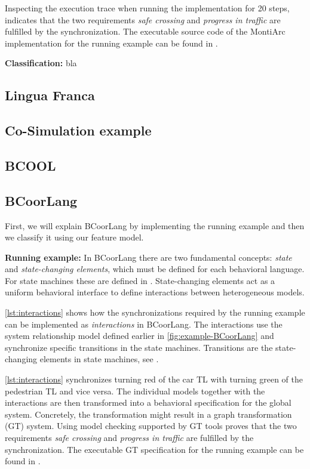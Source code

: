 \documentclass[runningheads]{llncs}
\begin{document}
Inspecting the execution trace when running the implementation for 20 steps, indicates that the two requirements \textit{safe crossing} and \textit{progress in traffic} are fulfilled by the synchronization.
The executable source code of the MontiArc implementation for the running example can be found in \cite{krauterCoordination2024Artifacts2024}.

\textbf{Classification:} bla
\subsection{Lingua Franca} %
\subsection{Co-Simulation example} %
\subsection{BCOOL} %
\subsection{BCoorLang}
First, we will explain BCoorLang by implementing the running example and then we classify it using our feature model.

\textbf{Running example:} In BCoorLang there are two fundamental concepts: \textit{state} and \textit{state-changing elements}, which must be defined for each behavioral language.
For state machines these are defined in \cite{krauterBehavioralConsistencyMultimodeling2023}.
State-changing elements act as a uniform behavioral interface to define interactions between heterogeneous models.

\autoref{lst:interactions} shows how the synchronizations required by the running example can be implemented as \textit{interactions} in BCoorLang.
The interactions use the system relationship model defined earlier in \autoref{fig:example-BCoorLang} and synchronize specific transitions in the state machines.
Transitions are the state-changing elements in state machines, see  \cite{krauterBehavioralConsistencyMultimodeling2023}.



\autoref{lst:interactions} synchronizes turning red of the car TL with turning green of the pedestrian TL and vice versa.
The individual models together with the interactions are then transformed into a behavioral specification for the global system.
Concretely, the transformation might result in a graph transformation (GT) system.
Using model checking supported by GT tools proves that the two requirements \textit{safe crossing} and \textit{progress in traffic} are fulfilled by the synchronization.
The executable GT specification for the running example can be found in \cite{krauterCoordination2024Artifacts2024}.
\end{document}

